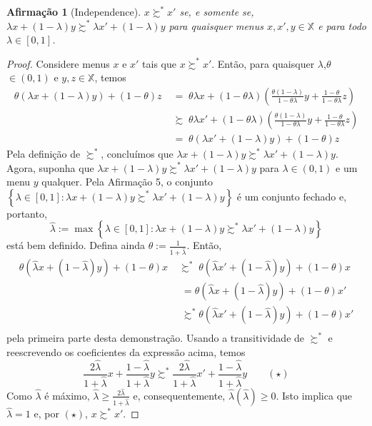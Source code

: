 \documentclass[11pt, a4paper]{article}
\theoremstyle{nonumberplain}
\newtheorem{proof}{Dem.}
\theoremstyle{plain}
\theoremstyle{plain}
\newtheorem{claim}{Afirmação}
\theoremstyle{plain}
\begin{document}
\begin{claim}[Independence] $x\succsim^*x'$ se, e somente se, $\lambda x + (1-\lambda)y\succsim^* \lambda x' + (1-\lambda)y$ para quaisquer menus $x,x',y\in \mathbb{X}$ e para todo $\lambda \in [0,1]$.\end{claim}
\begin{proof}
Considere menus $x$ e $x'$ tais que $x\succsim^* x'$. Então, para quaisquer $\lambda$,$\theta$ $\in (0,1)$ e $y,z\in\mathbb{X}$, temos
\begin{align*}
\theta(\lambda x + (1-\lambda)y)+(1-\theta)z \;&=\; \theta\lambda x + (1-\theta\lambda)\left(\frac{\theta(1-\lambda)}{1-\theta\lambda}y+\frac{1-\theta}{1-\theta\lambda}z\right)\\
&\succsim\;  \theta\lambda x' + (1-\theta\lambda)\left(\frac{\theta(1-\lambda)}{1-\theta\lambda}y+\frac{1-\theta}{1-\theta\lambda}z\right)\\
&=\; \theta(\lambda x' + (1-\lambda)y)+(1-\theta)z
\end{align*}
Pela definição de $\succsim^*$, concluímos que $\lambda x + (1-\lambda)y\succsim^*\lambda x' + (1-\lambda)y$. 
Agora, suponha que $\lambda x + (1-\lambda)y\succsim^*\lambda x' + (1-\lambda)y$ para $\lambda\in(0,1)$ e um menu $y$ qualquer. Pela Afirmação 5, o conjunto $\left\{\lambda\in[0,1]:\lambda x + (1-\lambda)y\succsim^*\lambda x' + (1-\lambda)y\right\}$ é um conjunto fechado e, portanto, $$\hat{\lambda}:=\max\left\{\lambda\in[0,1]:\lambda x + (1-\lambda)y\succsim^*\lambda x' + (1-\lambda)y\right\}$$ está bem definido. Defina ainda $\theta:=\frac{1}{1+\hat{\lambda}}$. Então,
\begin{align*}
\theta(\hat{\lambda}x+(1-\hat{\lambda})y)+(1-\theta)x\;&\succsim^*\;\theta(\hat{\lambda}x'+(1-\hat{\lambda})y)+(1-\theta)x\\
&\;= \theta(\hat{\lambda}x+(1-\hat{\lambda})y)+(1-\theta)x'\\
&\;\succsim^* \theta(\hat{\lambda}x'+(1-\hat{\lambda})y)+(1-\theta)x'\\  
\end{align*} pela primeira parte desta demonstração. Usando a transitividade de $\succsim^*$ e reescrevendo os coeficientes da expressão acima, temos $$\frac{2\hat{\lambda}}{1+\hat{\lambda}}x+\frac{1-\hat{\lambda}}{1+\hat{\lambda}}y \succsim^* \frac{2\hat{\lambda}}{1+\hat{\lambda}}x'+\frac{1-\hat{\lambda}}{1+\hat{\lambda}}y \qquad (\star)$$ Como $\hat{\lambda}$ é máximo, $\hat{\lambda}\geq \frac{2\hat{\lambda}}{1+\hat{\lambda}}$ e, consequentemente, $\hat{\lambda}(\hat{\lambda})\geq 0$. Isto implica que $\hat{\lambda}=1$ e, por $(\star)$, $x\succsim^* x'$.
\end{proof}
\end{document}
